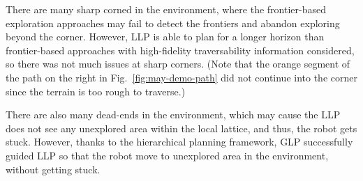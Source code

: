 \documentclass[letterpaper]{article} %
\begin{document}
There are many sharp corned in the environment, where the frontier-based exploration approaches may fail to detect the frontiers and abandon exploring beyond the corner.
However, LLP is able to plan for a longer horizon than frontier-based approaches with high-fidelity traversability information considered, so there was not much issues at sharp corners.
(Note that the orange segment of the path on the right in Fig.~\ref{fig:may-demo-path} did not continue into the corner since the terrain is too rough to traverse.)

There are also many dead-ends in the environment, which may cause the LLP does not see any unexplored area within the local lattice, and thus, the robot gets stuck.
However, thanks to the hierarchical planning framework, GLP successfully guided LLP so that the robot move to unexplored area in the environment, without getting stuck.
\end{document}

